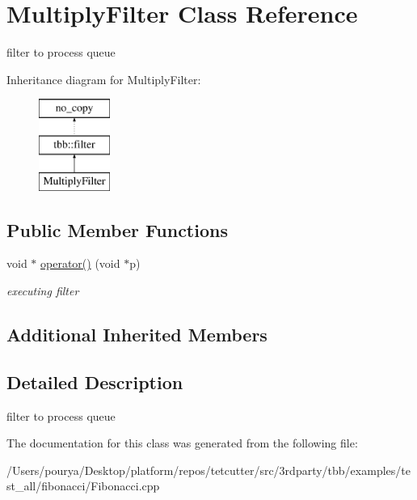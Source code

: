 \hypertarget{classMultiplyFilter}{}\section{Multiply\+Filter Class Reference}
\label{classMultiplyFilter}


filter to process queue  


Inheritance diagram for Multiply\+Filter\+:\begin{figure}[H]
\begin{center}
\leavevmode
\includegraphics[height=3.000000cm]{classMultiplyFilter}
\end{center}
\end{figure}
\subsection*{Public Member Functions}
\begin{DoxyCompactItemize}
\item 
\hypertarget{classMultiplyFilter_a04297d3dfd7e83c01cc0279a684b952a}{}void $\ast$ \hyperlink{classMultiplyFilter_a04297d3dfd7e83c01cc0279a684b952a}{operator()} (void $\ast$p)\label{classMultiplyFilter_a04297d3dfd7e83c01cc0279a684b952a}

\begin{DoxyCompactList}\small\item\em executing filter \end{DoxyCompactList}\end{DoxyCompactItemize}
\subsection*{Additional Inherited Members}


\subsection{Detailed Description}
filter to process queue 

The documentation for this class was generated from the following file\+:\begin{DoxyCompactItemize}
\item 
/\+Users/pourya/\+Desktop/platform/repos/tetcutter/src/3rdparty/tbb/examples/test\+\_\+all/fibonacci/Fibonacci.\+cpp\end{DoxyCompactItemize}
